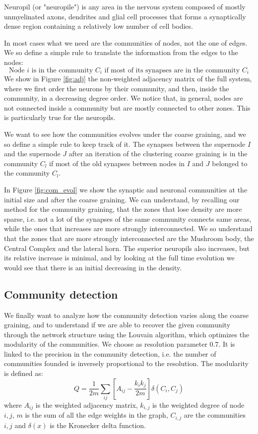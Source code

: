 Neuropil (or "neuropile") is any area in the nervous system composed of mostly unmyelinated axons, dendrites and glial 
cell processes that forms a synaptically dense region containing a relatively low 
number of cell bodies. 

In most cases what we need are the communities of nodes, not the one of edges. We so define a 
simple rule to translate the information from the edges to the nodes: 
$$
\mbox{Node $i$ is in the community $C_i$ if most of its synapses are in the community $C_i$}
$$
We show in Figure \ref{fig:adj} the non-weighted adjacency matrix of the full system, where we
first order the neurons by their community, and then, inside the community, in a decreasing 
degree order. We notice that, in general, nodes are not connected inside a community but are 
mostly connected to other zones. This is particularly true for the neuropils.

We want to see how the communities evolves under the coarse graining, and we so define a simple rule
to keep track of it. The synapses between the supernode $I$ and the supernode $J$ after an iteration
of the clustering coarse graining is in the community $C_l$ if most of the old synapses between
nodes in $I$ and $J$ belonged to the community $C_l$.

In Figure \ref{fig:com_evol} we show the synaptic and neuronal communities at the initial size and after the
coarse graining. We can understand, by recalling our method for the community graining, that the 
zones that lose density are more sparse, i.e. not a lot of the synapses of the same community connects
same areas, while the ones that increases are more strongly interconnected. We so understand that the zones
that are more strongly interconnected are the Mushroom body, the Central Complex and the lateral horn.
The superior neuropils also increases, but its relative increase is minimal, and by looking at the 
full time evolution we would see that there is an initial decreasing in the density.

\subsection{Community detection}
We finally want to analyze how the community detection varies along the coarse 
graining, and to understand if we are able to recover the given community through
the network structure using the Louvain algorithm, which optimizes the modularity
of the communities. We choose as resolution parameter $0.7$. It is 
linked to the precision in the community detection, i.e. the number 
of communities founded is inversely proportional to the resolution.
The modularity is defined as:
\begin{equation}
    Q = \frac{1}{2m}\sum_{ij} \left[A_{ij}-\frac{k_ik_j}{2m}\right] \delta(C_i, C_j)
\end{equation}
where $A_{ij}$ is the weighted adjacency matrix, $k_{i,j}$ is the weighted degree of node $i,j$,
$m$ is the sum of all the edge weights in the graph, $C_{i,j}$ are the communities $i,j$ and $\delta(x)$ is the
Kronecker delta function.

